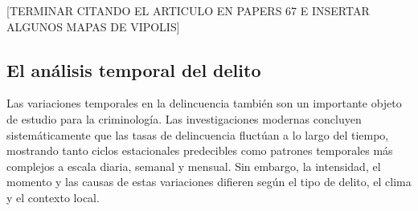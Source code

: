 \documentclass[
  spanish,
  letterpaper,
  DIV=11,
  numbers=noendperiod]{scrreprt}
\begin{document}
{[}TERMINAR CITANDO EL ARTICULO EN PAPERS 67 E INSERTAR ALGUNOS MAPAS DE
VIPOLIS{]}

\subsection{El análisis temporal del
delito}\label{el-anuxe1lisis-temporal-del-delito}

Las variaciones temporales en la delincuencia también son un importante
objeto de estudio para la criminología. Las investigaciones modernas
concluyen sistemáticamente que las tasas de delincuencia fluctúan a lo
largo del tiempo, mostrando tanto ciclos estacionales predecibles como
patrones temporales más complejos a escala diaria, semanal y mensual.
Sin embargo, la intensidad, el momento y las causas de estas variaciones
difieren según el tipo de delito, el clima y el contexto local.
\end{document}
